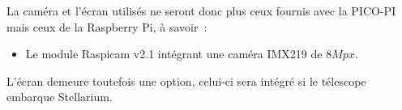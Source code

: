 \vspace{1cm}

La caméra et l'écran utilisés ne seront donc plus ceux fournis avec la PICO-PI mais ceux de la Raspberry Pi, à savoir~:
\begin{itemize}[label=$\bullet$]
	\item Le module Raspicam v2.1 intégrant une caméra IMX219 de $8Mpx$.
	\end{itemize}

\vspace{1cm}

L'écran demeure toutefois une option, celui-ci sera intégré si le télescope embarque Stellarium.


